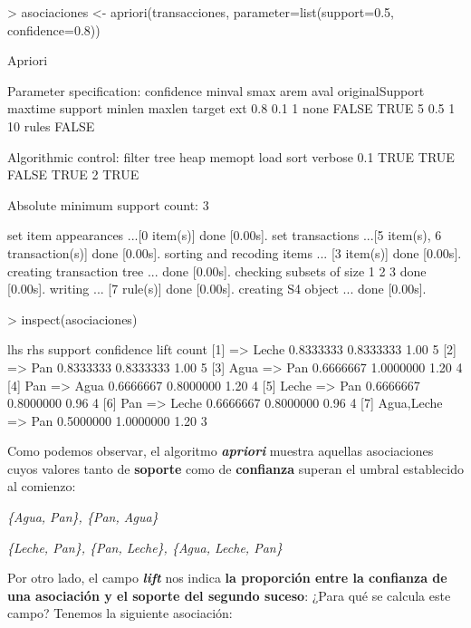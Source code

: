 \documentclass [a4paper] {article}
\begin{document}
\begin{Schunk}
\begin{Sinput}
> asociaciones <- apriori(transacciones, parameter=list(support=0.5, confidence=0.8))
\end{Sinput}
\begin{Soutput}
Apriori

Parameter specification:
 confidence minval smax arem  aval originalSupport maxtime support minlen maxlen target   ext
        0.8    0.1    1 none FALSE            TRUE       5     0.5      1     10  rules FALSE

Algorithmic control:
 filter tree heap memopt load sort verbose
    0.1 TRUE TRUE  FALSE TRUE    2    TRUE

Absolute minimum support count: 3 

set item appearances ...[0 item(s)] done [0.00s].
set transactions ...[5 item(s), 6 transaction(s)] done [0.00s].
sorting and recoding items ... [3 item(s)] done [0.00s].
creating transaction tree ... done [0.00s].
checking subsets of size 1 2 3 done [0.00s].
writing ... [7 rule(s)] done [0.00s].
creating S4 object  ... done [0.00s].
\end{Soutput}
\begin{Sinput}
> inspect(asociaciones)
\end{Sinput}
\begin{Soutput}
    lhs             rhs     support   confidence lift count
[1] {}           => {Leche} 0.8333333 0.8333333  1.00 5    
[2] {}           => {Pan}   0.8333333 0.8333333  1.00 5    
[3] {Agua}       => {Pan}   0.6666667 1.0000000  1.20 4    
[4] {Pan}        => {Agua}  0.6666667 0.8000000  1.20 4    
[5] {Leche}      => {Pan}   0.6666667 0.8000000  0.96 4    
[6] {Pan}        => {Leche} 0.6666667 0.8000000  0.96 4    
[7] {Agua,Leche} => {Pan}   0.5000000 1.0000000  1.20 3    
\end{Soutput}
\end{Schunk}

Como podemos observar, el algoritmo \textbf{\textit{apriori}} muestra aquellas asociaciones cuyos valores tanto de \textbf{soporte} como de \textbf{confianza} 
superan el umbral establecido al comienzo:
\newline

\hfil \textit{\{Agua, Pan\}, \{Pan, Agua\}} \par
\hfil \textit{\{Leche, Pan\}, \{Pan, Leche\}, \{Agua, Leche, Pan\}} \par \leavevmode

Por otro lado, el campo \textbf{\textit{lift}} nos indica \textbf{la proporción entre la confianza de una asociación y el soporte del segundo suceso}:
¿Para qué se calcula este campo? Tenemos la siguiente asociación:
\end{document}
